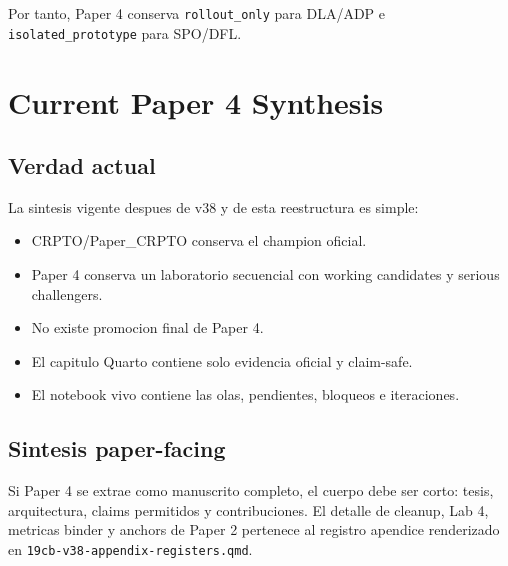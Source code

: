 \documentclass[
  spanish,
  11pt,
  letterpaper,
]{scrbook}
\providecommand{\tightlist}{%
  \setlength{\itemsep}{0pt}\setlength{\parskip}{0pt}}
\theoremstyle{plain}
\theoremstyle{remark}
\begin{document}
Por tanto, Paper 4 conserva \texttt{rollout\_only} para DLA/ADP e
\texttt{isolated\_prototype} para SPO/DFL.

\chapter{Current Paper 4 Synthesis}\label{current-paper-4-synthesis}

\section{Verdad actual}\label{verdad-actual}

La sintesis vigente despues de v38 y de esta reestructura es simple:

\begin{itemize}
\tightlist
\item
  CRPTO/Paper\_CRPTO conserva el champion oficial.
\item
  Paper 4 conserva un laboratorio secuencial con working candidates y
  serious challengers.
\item
  No existe promocion final de Paper 4.
\item
  El capitulo Quarto contiene solo evidencia oficial y claim-safe.
\item
  El notebook vivo contiene las olas, pendientes, bloqueos e
  iteraciones.
\end{itemize}

\section{Sintesis paper-facing}\label{sintesis-paper-facing}

Si Paper 4 se extrae como manuscrito completo, el cuerpo debe ser corto:
tesis, arquitectura, claims permitidos y contribuciones. El detalle de
cleanup, Lab 4, metricas binder y anchors de Paper 2 pertenece al
registro apendice renderizado en
\texttt{19cb-v38-appendix-registers.qmd}.
\end{document}
